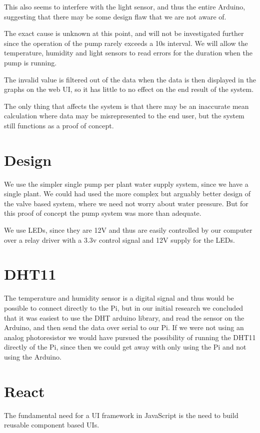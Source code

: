 \documentclass[12pt,a4paper,oneside]{book}
\begin{document}
This also seems to interfere with the light sensor, and thus the entire Arduino, suggesting that there may be some design flaw that we are not aware of.

The exact cause is unknown at this point, and will not be investigated further since the operation of the pump rarely exceeds a 10s interval. We will allow the temperature, humidity and light sensors to read errors for the duration when the pump is running.

The invalid value is filtered out of the data when the data is then displayed in the graphs on the web UI, so it has little to no effect on the end result of the system.

The only thing that affects the system is that there may be an inaccurate mean calculation where data may be misrepresented to the end user, but the system still functions as a proof of concept.

\section{Design}
We use the simpler single pump per plant water supply system, since we have a single plant.
We could had used the more complex but arguably better design of the valve based system, where we need not worry about water pressure. But for this proof of concept the pump system was more than adequate.

We use LEDs, since they are 12V and thus are easily controlled by our computer over a relay driver with a 3.3v control signal and 12V supply for the LEDs.

\section{DHT11}
The temperature and humidity sensor is a digital signal and thus would be possible to connect directly to the Pi, but in our initial research we concluded that it was easiest to use the DHT arduino library, and read the sensor on the Arduino, and then send the data over serial to our Pi. If we were not using an analog photoresistor we would have pursued the possibility of running the DHT11 directly of the Pi, since then we could get away with only using the Pi and not using the Arduino.

\section{React}
The fundamental need for a UI framework in JavaScript is the need to build reusable component based UIs.
\end{document}
